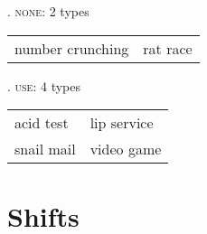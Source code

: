 \ex. \textsc{none}: 2 types\\
\begin{tabular}[h]{ll}
number crunching&rat race  
  \end{tabular}


\ex. \textsc{use}: 4 types\\
\begin{tabular}[h]{ll}
acid test&lip service\\       
snail mail&video game        
  \end{tabular}



\section{Shifts}
\label{sec:shifts_annotated}

